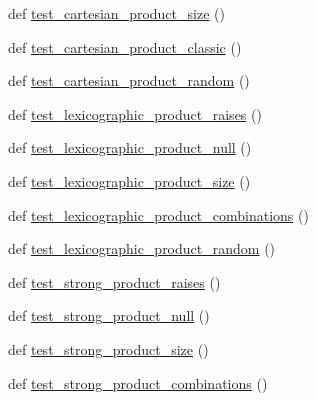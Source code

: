 \begin{DoxyCompactItemize}
\item 
def \hyperlink{namespacenetworkx_1_1algorithms_1_1operators_1_1tests_1_1test__product_a07ddf93fdc700e485e45967860088b78}{test\+\_\+cartesian\+\_\+product\+\_\+size} ()
\item 
def \hyperlink{namespacenetworkx_1_1algorithms_1_1operators_1_1tests_1_1test__product_a9e2140d012aab0f03ea0848cc1a39a73}{test\+\_\+cartesian\+\_\+product\+\_\+classic} ()
\item 
def \hyperlink{namespacenetworkx_1_1algorithms_1_1operators_1_1tests_1_1test__product_a5b818675aab8de55cd9071ffc60f5a3d}{test\+\_\+cartesian\+\_\+product\+\_\+random} ()
\item 
def \hyperlink{namespacenetworkx_1_1algorithms_1_1operators_1_1tests_1_1test__product_a2df16a7aeadc741daec7c9a68969bbeb}{test\+\_\+lexicographic\+\_\+product\+\_\+raises} ()
\item 
def \hyperlink{namespacenetworkx_1_1algorithms_1_1operators_1_1tests_1_1test__product_ac53ecfc02196d090f141ff77cc006013}{test\+\_\+lexicographic\+\_\+product\+\_\+null} ()
\item 
def \hyperlink{namespacenetworkx_1_1algorithms_1_1operators_1_1tests_1_1test__product_add4103083acb355dd3dd0ba1648e01f7}{test\+\_\+lexicographic\+\_\+product\+\_\+size} ()
\item 
def \hyperlink{namespacenetworkx_1_1algorithms_1_1operators_1_1tests_1_1test__product_ad6e632b947ed5e2b72e0ab64f2fa4f54}{test\+\_\+lexicographic\+\_\+product\+\_\+combinations} ()
\item 
def \hyperlink{namespacenetworkx_1_1algorithms_1_1operators_1_1tests_1_1test__product_acee11d39f3d7e670bb403e07e3335267}{test\+\_\+lexicographic\+\_\+product\+\_\+random} ()
\item 
def \hyperlink{namespacenetworkx_1_1algorithms_1_1operators_1_1tests_1_1test__product_ab6c41a28e452a16739297622a8bdf743}{test\+\_\+strong\+\_\+product\+\_\+raises} ()
\item 
def \hyperlink{namespacenetworkx_1_1algorithms_1_1operators_1_1tests_1_1test__product_afe24b2b4a273d4792749f45fa4b8893a}{test\+\_\+strong\+\_\+product\+\_\+null} ()
\item 
def \hyperlink{namespacenetworkx_1_1algorithms_1_1operators_1_1tests_1_1test__product_aabd17d41789deadb5c362c0b9f8d45cc}{test\+\_\+strong\+\_\+product\+\_\+size} ()
\item 
def \hyperlink{namespacenetworkx_1_1algorithms_1_1operators_1_1tests_1_1test__product_aa8e9da1e35badee1741f49d9ba015f95}{test\+\_\+strong\+\_\+product\+\_\+combinations} ()

\end{DoxyCompactItemize}
